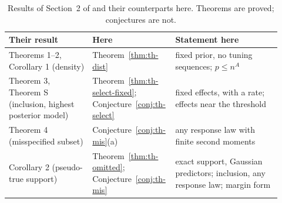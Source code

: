 \begin{table}[ht]
\centering\small
\caption{Results of Section~2 of \citet{SongLiang2015} and their counterparts here. Theorems are proved;
conjectures are not.}\label{tab:sl-map}
\begin{tabular}{@{}>{\raggedright\arraybackslash}p{0.30\linewidth}>{\raggedright\arraybackslash}p{0.24\linewidth}>{\raggedright\arraybackslash}p{0.38\linewidth}@{}}
\toprule
Their result & Here & Statement here \\
\midrule
Theorems 1--2, Corollary 1 (density) & Theorem~\ref{thm:th-dist} & fixed prior, no tuning sequences; $p\le n^A$ \\
Theorem 3, Theorem S (inclusion, highest posterior model) & Theorem~\ref{thm:th-select-fixed};
  Conjecture~\ref{conj:th-select} & fixed effects, with a rate; effects near the threshold \\
Theorem 4 (misspecified subset) & Conjecture~\ref{conj:th-mis}(a) & any response law with finite second moments \\
Corollary 2 (pseudo-true support) & Theorem~\ref{thm:th-omitted}; Conjecture~\ref{conj:th-mis} & exact support,
  Gaussian predictors; inclusion, any response law; margin form \\
\bottomrule
\end{tabular}
\end{table}
